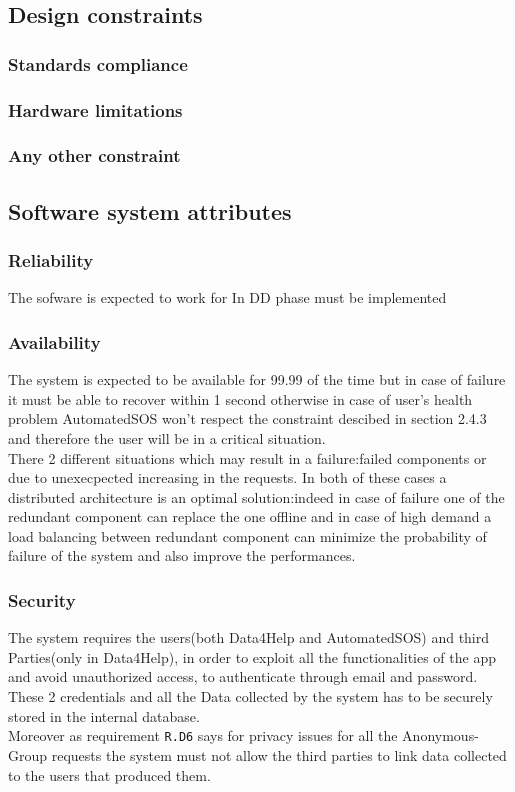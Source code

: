   \subsection{Design constraints}
    \subsubsection{Standards compliance}
    \subsubsection{Hardware limitations}
    \subsubsection{Any other constraint}
  \subsection{Software system attributes}
    \subsubsection{Reliability}
The sofware is expected to work for 
In DD phase must be implemented 
    \subsubsection{Availability}%
The system is expected to be available for 99.99 of the time but in case of failure it must be able to recover within 1 second otherwise in case of user's health problem AutomatedSOS won't respect the constraint descibed in section 2.4.3 and therefore the user will be in a critical situation.\\ There 2 different situations which may result in a failure:failed components or due to unexecpected increasing in the requests. In both of these cases a distributed architecture is an optimal solution:indeed in case of failure one of the redundant component can replace the one offline and in case of high demand a load balancing between redundant component can minimize the probability of failure of the system and also improve the performances.
    \subsubsection{Security}
The system requires the users(both Data4Help and AutomatedSOS) and third Parties(only in Data4Help), in order to exploit all the functionalities of the app and avoid unauthorized access, to authenticate through email and password.\\ These 2 credentials and all the Data collected by the system has to be securely stored in the internal database.\\ Moreover as  requirement \texttt{R.D6} says for privacy issues for all the Anonymous-Group requests the system must not allow the third parties to link data collected to the users that produced them.

